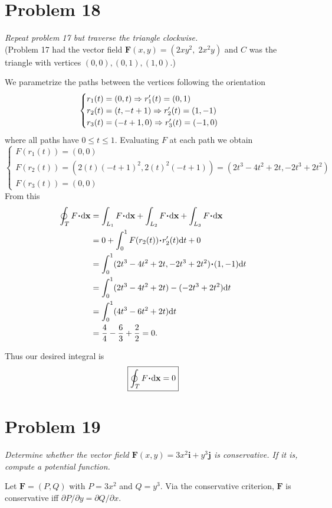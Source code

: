 \documentclass[12pt]{memoir}
\begin{document}
\section*{Problem 18}
\textit{Repeat problem 17 but traverse the triangle clockwise.}\\
(Problem 17 had the vector field \(\mathbf F(x,y)=\left( 2xy^2,\;2x^2y\right)\) and \(C\) was the triangle with vertices \((0,0),(0,1),(1,0)\).)

We parametrize the paths between the vertices following the orientation
\[
    \begin{cases}
    r_1(t)=(0,t)\Rightarrow r_1'(t)=(0,1)\\
    r_2(t)=(t,-t+1)\Rightarrow r_2'(t)=(1,-1)\\
    r_3(t)=(-t+1,0)\Rightarrow r_3'(t)=(-1,0)
\end{cases}
\]
where all paths have \(0\leq t\leq 1\). Evaluating \(F\) at each path we obtain
\[
    \begin{cases}
    F(r_1(t))=(0,0)\\
    F(r_2(t))=(2(t)(-t+1)^2,2(t)^2(-t+1))=(2 t^3 - 4 t^2 + 2 t,-2t^3+2t^2)\\
    F(r_3(t))=(0,0)
\end{cases}
\]
From this 
\begin{align*}
\oint_T F\.\dd\vec x &= \int_{L_1}F\.\dd\vec x +\int_{L_2}F\.\dd\vec x +\int_{L_3}F\.\dd\vec x \\
&= 0+\int_{0}^1F(r_2(t))\.r_2'(t)\dd t +0 \\
&= \int_{0}^1(2 t^3 - 4 t^2 + 2 t,-2t^3+2t^2)\.(1,-1)\dd t \\
&= \int_{0}^1(2 t^3 - 4 t^2 + 2 t)-(-2t^3+2t^2)\dd t \\
&= \int_{0}^1(4 t^3 - 6 t^2 + 2 t)\dd t \\
&=\frac44-\frac63+\frac22=0.
\end{align*}

Thus our desired integral is 
\[
\boxed{\oint_T F\.\dd\vec x = 0}
\]
\section*{Problem 19}
\textit{Determine whether the vector field \(\mathbf F(x,y)=3x^2\mathbf i + y^3\mathbf j\) is conservative. If it is, compute a potential function.}

Let \(\mathbf F=\left( P,Q\right)\) with \(P=3x^2\) and \(Q=y^3\). Via the conservative criterion, \(\mathbf F\) is conservative iff \(\partial P/\partial y=\partial Q/\partial x\).
\end{document}
